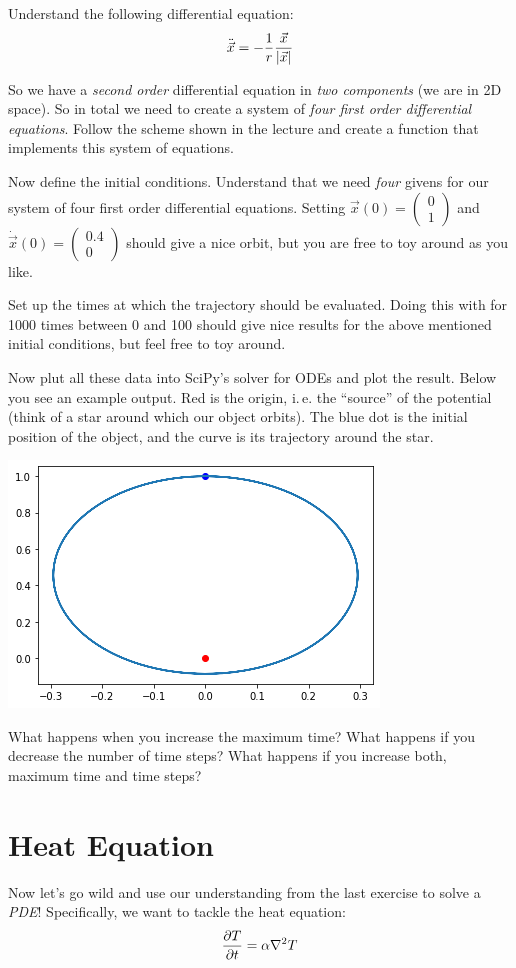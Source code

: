 \documentclass[
	english,
	fontsize=10pt,
	parskip=half,
	titlepage=true,
	DIV=12
]{scrartcl}
\newcommand*{\ie}{i.\,e. }
\begin{document}
Understand the following differential equation:
\[ \ddot{\vec{x}} = -\frac{1}{r} \frac{\vec{x}}{\abs{\vec{x}}} \]

So we have a \emph{second order} differential equation in \emph{two components} (we are in 2D space). So in total we need to create a system of \emph{four first order differential equations}. Follow the scheme shown in the lecture and create a function that implements this system of equations.

Now define the initial conditions. Understand that we need \emph{four} givens for our system of four first order differential equations. Setting 
$\vec{x}(0) = \begin{pmatrix}
	0 \\ 1
\end{pmatrix}$
and
$\dot{\vec{x}}(0) = \begin{pmatrix}
	0.4 \\ 0
\end{pmatrix}$
should give a nice orbit, but you are free to toy around as you like.

Set up the times at which the trajectory should be evaluated. Doing this with for 1000 times between 0 and 100 should give nice results for the above mentioned initial conditions, but feel free to toy around.

Now plut all these data into SciPy's solver for ODEs and plot the result. Below you see an example output. Red is the origin, \ie the \enquote{source} of the potential (think of a star around which our object orbits). The blue dot is the initial position of the object, and the curve is its trajectory around the star.
\begin{center}
	\includegraphics[width=.4\linewidth]{./orbit-example}
\end{center}

What happens when you increase the maximum time? What happens if you decrease the number of time steps? What happens if you increase both, maximum time and time steps?

\section{Heat Equation}
Now let's go wild and use our understanding from the last exercise to solve a \emph{PDE}! Specifically, we want to tackle the heat equation:
\[ \pdv{T}{t} = \alpha \laplacian T \]
\end{document}
